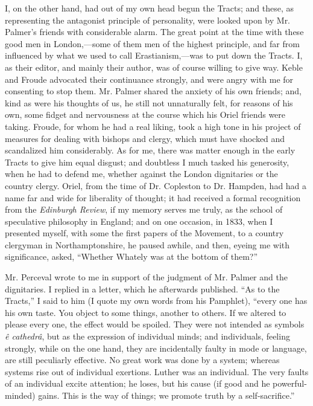 I, on the other hand, had out of my own head begun the Tracts; and
these, as representing the antagonist principle of personality, were
looked upon by Mr. Palmer's friends with considerable alarm. The great
point at the time with these good men in London,—some of them men of
the highest principle, and far from influenced by what we used to call
Erastianism,—was to put down the Tracts. I, as their editor, and
mainly their author, was of course willing to give way.
Keble and Froude advocated their continuance strongly, and were angry
with me for consenting to stop them. Mr. Palmer shared the anxiety of
his own friends; and, kind as were his thoughts of us, he still not
unnaturally felt, for reasons of his own, some fidget and nervousness at
the course which his Oriel friends were taking. Froude, for whom he had
a real liking, took a high tone in his project of measures for dealing
with bishops and clergy, which must have shocked and scandalized him
considerably. As for me, there was matter enough in the early Tracts to
give him equal disgust; and doubtless I much tasked his generosity, when
he had to defend me, whether against the London dignitaries or the
country clergy. Oriel, from the time of Dr. Copleston to Dr. Hampden,
had had a name far and wide for liberality of thought; it had received a
formal recognition from the \emph{Edinburgh Review}, if my memory serves me
truly, as the school of speculative philosophy in England; and on one
occasion, in 1833, when I presented myself, with some the first papers
of the Movement, to a country clergyman in Northamptonshire, he paused
awhile, and then, eyeing me with significance, asked,
``Whether Whately was at the bottom of them?''

Mr. Perceval wrote to me in support of the judgment of Mr. Palmer and
the dignitaries. I replied in a letter, which he afterwards published.
``As to the Tracts,'' I said to him (I quote my own words from
his Pamphlet), ``every one has his own taste. You object to some
things, another to others. If we altered to please every one, the effect
would be spoiled. They were not intended as symbols \emph{ê cathedrâ},
but as the expression of individual minds; and individuals, feeling
strongly, while on the one hand, they are incidentally faulty in mode or
language, are still peculiarly effective. No great work was done by a
system; whereas systems rise out of individual exertions. Luther was an
individual. The very faults of an individual excite attention; he loses,
but his cause (if good and he powerful-minded) gains. This is the way of
things; we promote truth by a self-sacrifice.''


